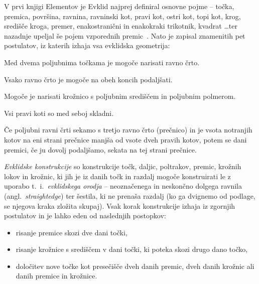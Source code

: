 V prvi knjigi Elementov je Evklid najprej definiral osnovne pojme -- točka, premica, površina, ravnina, ravninski kot, pravi kot, ostri kot, topi kot, krog, središče kroga, premer, enakostranični in enakokraki trikotnik, kvadrat \ldots ter nazadnje upeljal še pojem vzporednih premic~\cite{euclidI}. Nato je zapisal znamenitih pet postulatov, iz katerih izhaja vsa evklidska geometrija:

\renewcommand{\thepostulat}{P\arabic{postulat}}

\begin{postulat}
    \label{post:P1}
    Med dvema poljubnima točkama je mogoče narisati ravno črto.
\end{postulat}
\begin{postulat}
    \label{post:P2}
    Vsako ravno črto je mogoče na obeh koncih podaljšati.
\end{postulat}
\begin{postulat}
    \label{post:P3}
    Mogoče je narisati krožnico s poljubnim središčem in poljubnim polmerom.
\end{postulat}
\begin{postulat}
    \label{post:P4}
    Vsi pravi koti so med seboj skladni.
\end{postulat}
\begin{postulat}
    \label{post:P5}
    Če poljubni ravni črti sekamo s tretjo ravno črto (prečnico) in je vsota notranjih kotov na eni strani prečnice manjša od vsote dveh pravih kotov, potem se dani premici, če ju dovolj podaljšamo, sekata na tej strani prečnice.
\end{postulat}

\begin{definicija}
    \label{def:evklidske_konstrukcije}
    \emph{Evklidske konstrukcije} so konstrukcije točk, daljic, poltrakov, premic, krožnih lokov in krožnic, ki jih je iz danih točk in razdalj mogoče konstruirati le z uporabo t.~i.\ \emph{evklidskega orodja} -- neoznačenega in neskončno dolgega ravnila (angl.\ \emph{straightedge}) ter šestila, ki ne prenaša razdalj (ko ga dvignemo od podlage, se njegova kraka zložita skupaj). Vsak korak konstrukcije izhaja iz zgornjih postulatov in je lahko eden od naslednjih postopkov:
    \begin{itemize}
        \item risanje premice skozi dve dani točki,
        \item risanje krožnice s središčem v dani točki, ki poteka skozi drugo dano točko,
        \item določitev nove točke kot presečišče dveh danih premic, dveh danih krožnic ali danih premice in krožnice.
    \end{itemize}
\end{definicija}

